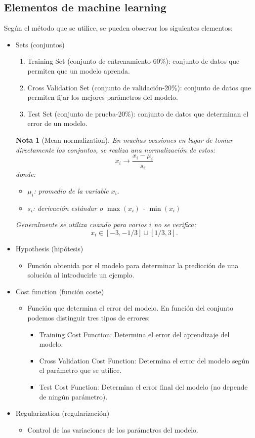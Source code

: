 \documentclass[12pt,a4paper]{article}
\newtheorem{nota}{Nota}[subsection]
\begin{document}
\subsection{Elementos de machine learning}
Según el método que se utilice, se pueden observar los siguientes elementos:
\begin{itemize}
\item Sets (conjuntos)
\begin{enumerate}
\item Training Set (conjunto de entrenamiento-60\%): conjunto de datos que permiten que un modelo aprenda.
\item Cross Validation Set (conjunto de validación-20\%): conjunto de datos que permiten fijar los mejores parámetros del modelo.
\item Test Set (conjunto de prueba-20\%): conjunto de datos que determinan el error de un modelo.
\end{enumerate}
\begin{nota}[Mean normalization]
En muchas ocasiones en lugar de tomar directamente los conjuntos, se realiza una normalización de estos:
\begin{equation}
x_i \rightarrow \dfrac{x_i-\mu_i}{s_i}
\end{equation}
donde: 
\begin{itemize}
\item $\mu_i$: promedio de la variable $x_i$.
\item $s_i$: derivación estándar o $\max (x_i)$ - $\min (x_i)$
\end{itemize}
Generalmente se utiliza cuando para varios $i$ no se verifica:
$$x_i \in [-3,-1/3] \cup [1/3,3].$$
\end{nota}
\item Hypothesis (hipótesis)
\begin{itemize}
\item Función obtenida por el modelo para determinar la predicción de una solución al introducirle un ejemplo.
\end{itemize}
\item Cost function (función coste)
\begin{itemize}
\item Función que determina el error del modelo. En función del conjunto podemos distinguir tres tipos de errores:
\begin{itemize}
\item Training Cost Function: Determina el error del aprendizaje del modelo.
\item Cross Validation Cost Function: Determina el error del modelo según el parámetro que se utilice. 
\item Test Cost Function: Determina el error final del modelo (no depende de ningún parámetro).
\end{itemize}
\end{itemize}
\item Regularization (regularización)
\begin{itemize}
\item Control de las variaciones de los parámetros del modelo. 
\end{itemize}
\end{itemize}
\end{document}
